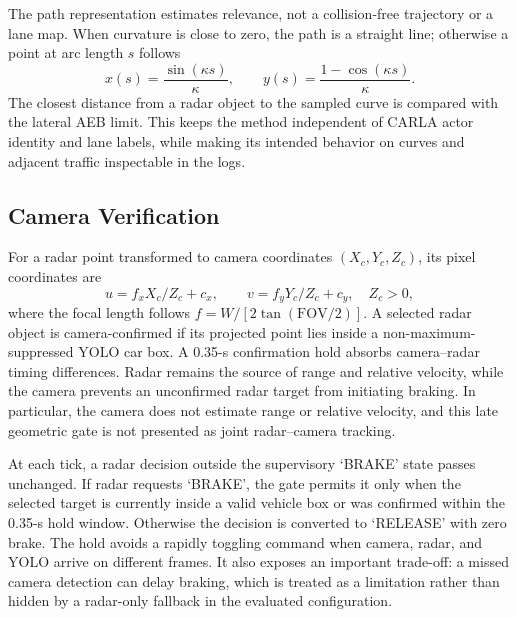\documentclass[conference]{IEEEtran}
\begin{document}
The path representation estimates relevance, not a collision-free trajectory or
a lane map. When curvature is close to zero, the path is a straight line;
otherwise a point at arc length $s$ follows
\begin{equation}
x(s)=\frac{\sin(\kappa s)}{\kappa},\qquad
y(s)=\frac{1-\cos(\kappa s)}{\kappa}.
\label{eq:path}
\end{equation}
The closest distance from a radar object to the sampled curve is compared with
the lateral AEB limit. This keeps the method independent of CARLA actor identity
and lane labels, while making its intended behavior on curves and adjacent
traffic inspectable in the logs.

\subsection{Camera Verification}
For a radar point transformed to camera coordinates $(X_c,Y_c,Z_c)$, its pixel
coordinates are
\begin{equation}
 u=f_xX_c/Z_c+c_x,\qquad v=f_yY_c/Z_c+c_y, \quad Z_c>0,
 \label{eq:projection}
\end{equation}
where the focal length follows $f=W/[2\tan(\mathrm{FOV}/2)]$. A selected radar
object is camera-confirmed if its projected point lies inside a
non-maximum-suppressed YOLO car box. A 0.35-s confirmation hold absorbs
camera--radar timing differences. Radar remains the source of range and relative
velocity, while the camera prevents an unconfirmed radar target from initiating
braking. In particular, the camera does not estimate range or relative velocity,
and this late geometric gate is not presented as joint radar--camera tracking.

At each tick, a radar decision outside the supervisory `BRAKE' state passes
unchanged. If radar requests `BRAKE', the gate permits it only when the selected
target is currently inside a valid vehicle box or was confirmed within the
0.35-s hold window. Otherwise the decision is converted to `RELEASE' with zero
brake. The hold avoids a rapidly toggling command when camera, radar, and YOLO
arrive on different frames. It also exposes an important trade-off: a missed
camera detection can delay braking, which is treated as a limitation rather than
hidden by a radar-only fallback in the evaluated configuration.
\end{document}
